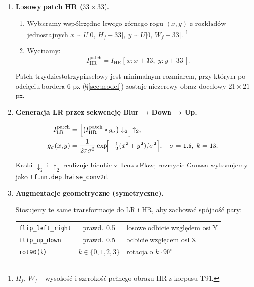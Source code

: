\documentclass[11pt]{article}
\begin{document}
\begin{enumerate}
\item \textbf{Losowy patch HR (\(33\times33\)).}

\begin{enumerate}
\item Wybieramy współrzędne lewego-górnego rogu
      \((x,y)\) z rozkładów jednostajnych  
      \(x\sim U\bigl[0,\,H_f-33\bigr],\;
        y\sim U\bigl[0,\,W_f-33\bigr]\).%
      \footnote{$H_f,\,W_f$ – wysokość i szerokość pełnego obrazu HR
      z korpusu T91.}
\item Wycinamy:
\[
  I_\mathrm{HR}^{\mathrm{patch}} = 
  I_\mathrm{HR}[\,x:x+33,\; y:y+33\,].
\]
\end{enumerate}

Patch trzydziestotrzy­pikselowy jest minimalnym rozmiarem, przy którym
po odcięciu bordera \(6\) px (\S\ref{sec:model}) zostaje niezerowy obraz
docelowy \(21\times21\) px.

\item \textbf{Generacja LR przez sekwencję Blur → Down → Up.}

\begin{align}
  I_\mathrm{LR}^{\mathrm{patch}}
  &= \Bigl[\bigl(I_\mathrm{HR}^{\mathrm{patch}} * g_{\sigma}\bigr)
      \downarrow_{2}\,\Bigr]\!\uparrow_{2},
  \\
  g_{\sigma}(x,y) &= \frac{1}{2\pi\sigma^{2}}
      \exp\!\Bigl[-\tfrac12(x^{2}+y^{2})/\sigma^{2}\Bigr],
      \quad
      \sigma = 1.6,\; k = 13.
\end{align}

Kroki \(\downarrow_{2}\) i \(\uparrow_{2}\) realizuje bicubic
z TensorFlow; rozmycie Gaussa wykonujemy jako
\texttt{tf.nn.depthwise\_conv2d}.

\item \textbf{Augmentacje geometryczne (symetryczne).}

Stosujemy te same transformacje do LR i HR, aby zachować spójność pary:  

\begin{center}
\begin{tabular}{lcl}
\texttt{flip\_left\_right} & prawd.\ 0.5 & losowe odbicie względem osi Y\\
\texttt{flip\_up\_down}    & prawd.\ 0.5 & odbicie względem osi X\\
\texttt{rot90(k)}          & \(k\in\{0,1,2,3\}\) & rotacja o \(k\cdot90^\circ\)
\end{tabular}
\end{center}


\end{enumerate}
\end{document}

